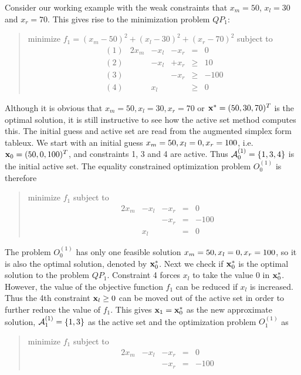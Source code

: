 \documentclass{uist96}
\begin{document}
Consider our working example with the weak constraints that
$x_m=50$, $x_l=30$ and $x_r=70$\@. This gives rise to the
minimization problem $QP_1:$
\begin{quote}
minimize $f_1 = (x_m - 50)^2 + (x_l - 30)^2 
+ (x_r - 70)^2 $ subject to
$$
\begin{array}{rrrrcl}
(1)  & 2 x_m & -x_l & -x_r & = & 0 \\
(2)      &       & -x_l & +x_r & \geq & 10 \\
(3)      &       &      & -x_r & \geq & -100 \\
(4)      &       & x_l  &      & \geq & 0 
\end{array}
$$
\end{quote}
Although it is obvious that $x_m = 50, x_l = 30, x_r = 70 $
or $ {\bf x}^\ast = (50,30,70)^T$ is the optimal solution, it is still
instructive to see how the active set method computes this. 
The initial guess and active set are read from the augmented simplex form
tableux. We start with
an initial guess $x_m = 50, x_l = 0, \linebreak x_r = 100$,
i.e.\ ${\bf x}_0=(50,0,100)^T$,
and constraints 1, 3 and 4 are active. Thus 
${\cal A}^{(1)}_0 = \{ 1,3,4 \}$ is the initial active set. The equality
constrained optimization problem $O^{(1)}_0$ is therefore
\begin{quote}
minimize $f_1$ subject to
$$
\begin{array}{rrrrrr}
          & 2x_m & -x_l & -x_r & = & 0 \\
	  &      &      & -x_r & = & -100 \\
	  &      & x_l  &      & = & 0
\end{array}
$$
\end{quote}
The problem $O^{(1)}_0$ has only one feasible solution $x_m = 50, \linebreak
x_l = 0,
x_r = 100$, so it is also the optimal solution, denoted by ${\bf x}^\ast_0$\@.
Next we check if ${\bf x}^\ast_0$ is the optimal solution to the problem
$QP_1$\@. Constraint 4 forces $x_l$ to take the value 0
in ${\bf x}^\ast_0$\@. However, the value of the
objective function $f_1$ can be reduced if $x_l$ 
is increased. 
Thus the 4th constraint ${\bf x}_l \geq 0 $ can be moved out of the active
set in order to further reduce the value of $f_1$\@. This gives
${\bf x}_1 = {\bf x}^\ast_0$ as the new approximate
solution, ${\cal A}^{(1)}_1 = \{1,3\}$ as the active set and the optimization
problem $O^{(1)}_1$ as 
\begin{quote}
minimize $f_1$ subject to
$$\begin{array}{rrrrrr} 
          & 2x_m & -x_l & -x_r & = & 0 \\
	  &      &      & -x_r & = & -100
\end{array}
$$
\end{quote}
\end{document}
